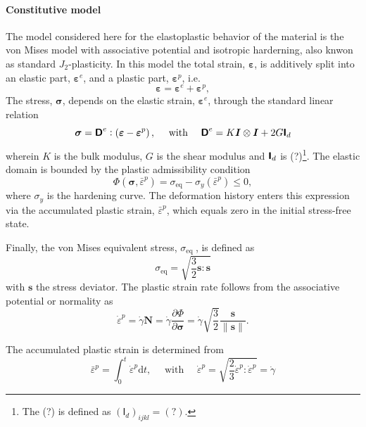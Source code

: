 \paragraph{Constitutive model}
The model considered here for the elastoplastic behavior of the material is the von Mises model with associative potential and isotropic harderning, also knwon as standard \(J_{2}\)-plasticity.
In this model the total strain, \(\bm \varepsilon\), is additively split into an elastic part, \(\bm \varepsilon^e\), and a plastic part, \(\bm \varepsilon^p\), i.e.
\begin{equation}
\bm \varepsilon=\bm \varepsilon^e+\bm \varepsilon^p,
\end{equation}
The stress, \(\bm\sigma\), depends on the elastic strain, \(\bm \varepsilon^{e}\), through the standard linear relation
\begin{equation}
\bm \sigma=\boldsymbol{\mathsf{D}}^{e}:\left(\bm \varepsilon-\bm\varepsilon^p\right), \quad \text { with } \quad \boldsymbol{\mathsf{D}}^e=K \bm{I} \otimes \bm{I}+2 G \boldsymbol{\mathsf{I}}_{d}
\end{equation}
wherein \(K\) is the bulk modulus, \(G\) is the shear modulus and \(\boldsymbol{\mathsf{I}}_d\) is (?)\footnote{The (?) is defined as \((\mathsf I_d)_{ijkl}=(?)\).}.
The elastic domain is bounded by the plastic admissibility condition
\begin{equation}
\Phi\left(\bm \sigma, \bar{\varepsilon}^p\right) =\sigma_\text{eq} - \sigma_y(\bar{\varepsilon}^p)\leq 0,
\end{equation}
where \(\sigma_y\) is the hardening curve.
The deformation history enters this expression via the accumulated plastic strain, \(\bar{\varepsilon}^p\), which equals zero in the initial stress-free state.

Finally, the von Mises equivalent stress, \(\sigma_{\text {eq }}\), is defined as
\begin{equation}
\sigma_\text{eq}=\sqrt{\frac{3}{2} \bm s: \bm s}
\end{equation}
with \(\bm s\) the stress deviator.
The plastic strain rate follows from the associative potential or normality as
\begin{equation}
\dot{\varepsilon}^p=\dot{\gamma} \bm{N}=\dot{\gamma} \frac{\partial \Phi}{\partial \boldsymbol{\sigma}}=\dot{\gamma} \sqrt{\frac{3}{2}} \frac{\bm s}{\|\bm s\|}.
\end{equation}

The accumulated plastic strain is determined from
\begin{equation}
\bar{\varepsilon}^p=\int_{0}^{t} \dot{\varepsilon}^p \mathrm{d} t, \quad \text { with } \quad \dot{\varepsilon}^p=\sqrt{\frac{2}{3} \dot{\varepsilon}^p: \dot{\varepsilon}^p}=\dot{\gamma}
\end{equation}

